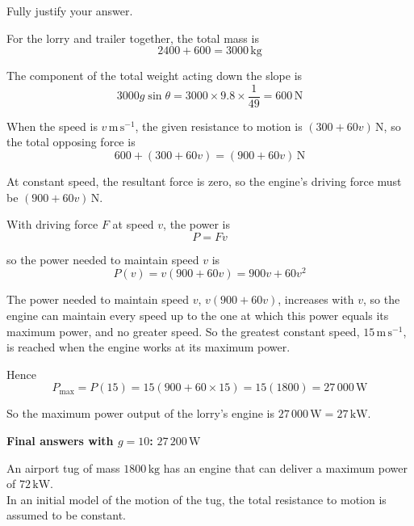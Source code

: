 \documentclass[leqno]{article}
\begin{document}
\begin{enumerate}[
  label=\textbf{\arabic*.},
  leftmargin=*,
  topsep=0pt,
  partopsep=0pt,
  parsep=0pt
]
Fully justify your answer.  \\

\vspace*{10pt}

\begin{djsSolution}
For the lorry and trailer together, the total mass is
\[
2400+600=3000\,\mathrm{kg}
\]

The component of the total weight acting down the slope is
\[
3000g\sin\theta=3000\times 9.8\times \frac{1}{49}=600\,\mathrm{N}
\]

When the speed is \(v\,\mathrm{m\,s^{-1}}\), the given resistance to motion is \((300+60v)\,\mathrm{N}\), so the total opposing force is
\[
600+(300+60v)=(900+60v)\,\mathrm{N}
\]

At constant speed, the resultant force is zero, so the engine's driving force must be \((900+60v)\,\mathrm{N}\).

With driving force \(F\) at speed \(v\), the power is
\[
P=Fv
\]

so the power needed to maintain speed \(v\) is
\[
P(v)=v(900+60v)=900v+60v^2
\]

The power needed to maintain speed \(v\), \(v(900+60v)\), increases with \(v\), so the engine can maintain every speed up to the one at which this power equals its maximum power, and no greater speed. So the greatest constant speed, \(15\,\mathrm{m\,s^{-1}}\), is reached when the engine works at its maximum power.

Hence
\[
P_{\max}=P(15)=15(900+60\times 15)=15(1800)=27\,000\,\mathrm{W}
\]

So the maximum power output of the lorry's engine is \(27\,000\,\mathrm{W}=27\,\mathrm{kW}\).
\par\medskip\noindent\textbf{Final answers with \(g = 10\):} \(27\,200\,\mathrm{W}\)
\end{djsSolution}


\newpage

\questionitem

An airport tug of mass $1800\,\mathrm{kg}$ has an engine that can deliver a maximum power of $72\,\mathrm{kW}$. \\

In an initial model of the motion of the tug, the total resistance to motion is assumed to be constant. \\


\end{enumerate}
\end{document}
